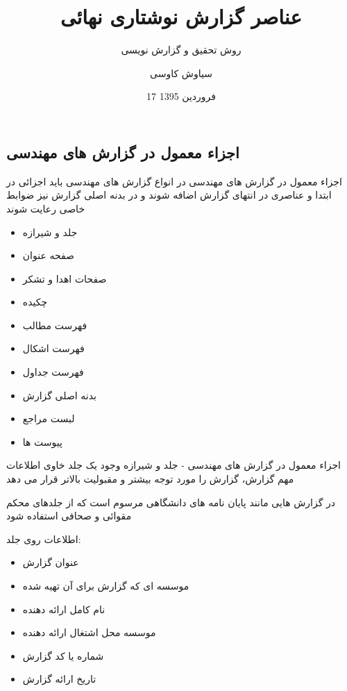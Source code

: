 \documentclass[14pt]{beamer}
\title{عناصر گزارش نوشتاری نهائی}
\subtitle{\color{brown} روش تحقیق و گزارش نویسی}
\date{17 فروردین 1395}
\author{سیاوش کاوسی}
\institute{دانشگاه صنعتی امیرکبیر}
\makeatletter
\newcommand{\rtlist}{\raggedleft\rightskip\@totalleftmargin}
\newcommand{\sectionfontsize}{\fontsize{22pt}{0pt}\selectfont}
\newcommand{\framefontsizelarge}{\fontsize{18pt}{0pt}\selectfont}
\newcommand{\frametitlefontsize}{\fontsize{20pt}{0pt}\selectfont}
\makeatother
\begin{document}
\begin{persian}
	\maketitle
	\everypar{\rightskip\rightmargin}		
	
	\section{\sectionfontsize اجزاء معمول در گزارش های مهندسی}	
	
	\begin{frame}[allowframebreaks]{\frametitlefontsize اجزاء معمول در گزارش های مهندسی}
		\framefontsizelarge
		در انواع گزارش های مهندسی باید اجزائی در ابتدا و عناصری در انتهای گزارش اضافه شوند و در بدنه اصلی گزارش نیز ضوابط خاصی رعایت شوند
		
		\begin{itemize}\rtlist
			\item جلد و شیرازه
			\item صفحه عنوان
			\item صفحات اهدا و تشکر
			\item چکیده
			\item فهرست مطالب
			\item فهرست اشکال
			\item فهرست جداول
			\item بدنه اصلی گزارش
			\item لبست مراجع
			\item پیوست ها
		\end{itemize}
	\end{frame}	
	
	\begin{frame}[plain]{\frametitlefontsize  اجزاء معمول در گزارش های مهندسی - جلد و شیرازه}
		\framefontsizelarge
		وجود یک جلد خاوی اطلاعات مهم گزارش، گزارش را مورد توجه بیشتر و مقبولیت بالاتر قرار می دهد
		
		در گزارش هایی مانند پایان نامه های دانشگاهی مرسوم است که از جلدهای محکم مقوائی و صحافی استفاده شود
		
		اطلاعات روی جلد:
		\begin{itemize}\rtlist
			\item عنوان گزارش
			\item موسسه ای که گزارش برای آن تهیه شده
			\item نام کامل ارائه دهنده
			\item موسسه محل اشتغال ارائه دهنده
			\item شماره یا کد گزارش
			\item تاریخ ارائه گزارش
		\end{itemize}
	\end{frame}	
	

\end{persian}
\end{document}
